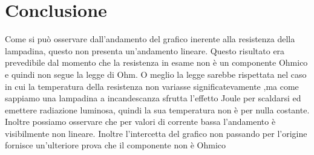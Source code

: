 \section*{Conclusione}

Come si può osservare dall'andamento del grafico inerente alla resistenza della lampadina, questo non presenta un'andamento lineare. Questo risultato era prevedibile dal momento che la resistenza in esame non è un componente Ohmico e quindi non segue la legge di Ohm. O meglio la legge sarebbe rispettata nel caso in cui la temperatura della resistenza non variasse significatevamente ,ma come sappiamo una lampadina a incandescanza sfrutta l'effetto Joule per scaldarsi ed emettere radiazione luminosa, quindi la sua temperatura non è per nulla costante.
Inoltre possiamo osservare che per valori di corrente bassa l'andamento è visibilmente non lineare. Inoltre l'intercetta del grafico non passando per l'origine fornisce un'ulteriore prova che il componente non è Ohmico
